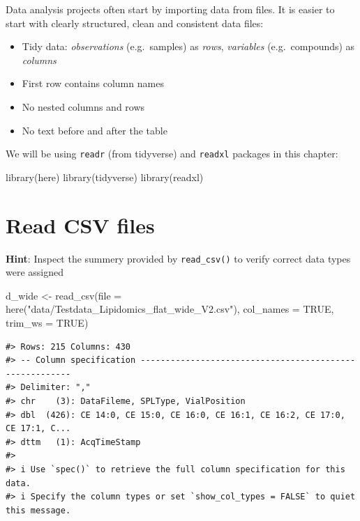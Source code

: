 \documentclass[
  letterpaper,
  DIV=11,
  numbers=noendperiod]{scrreprt}
\newenvironment{Shaded}{\begin{snugshade}}{\end{snugshade}}
\newcommand{\AttributeTok}[1]{\textcolor[rgb]{0.40,0.45,0.13}{#1}}
\newcommand{\ConstantTok}[1]{\textcolor[rgb]{0.56,0.35,0.01}{#1}}
\newcommand{\FunctionTok}[1]{\textcolor[rgb]{0.28,0.35,0.67}{#1}}
\newcommand{\NormalTok}[1]{\textcolor[rgb]{0.00,0.23,0.31}{#1}}
\newcommand{\OtherTok}[1]{\textcolor[rgb]{0.00,0.23,0.31}{#1}}
\newcommand{\StringTok}[1]{\textcolor[rgb]{0.13,0.47,0.30}{#1}}
\providecommand{\tightlist}{%
  \setlength{\itemsep}{0pt}\setlength{\parskip}{0pt}}\usepackage{longtable,booktabs,array}
\begin{document}
Data analysis projects often start by importing data from files. It is
easier to start with clearly structured, clean and consistent data
files:

\begin{itemize}
\tightlist
\item
  Tidy data: \emph{observations} (e.g.~samples) as \emph{rows},
  \emph{variables} (e.g.~compounds) as \emph{columns}
\item
  First row contains column names
\item
  No nested columns and rows
\item
  No text before and after the table
\end{itemize}

We will be using \texttt{readr} (from tidyverse) and \texttt{readxl}
packages in this chapter:

\begin{Shaded}
\begin{Highlighting}[]
\FunctionTok{library}\NormalTok{(here)}
\FunctionTok{library}\NormalTok{(tidyverse)}
\FunctionTok{library}\NormalTok{(readxl)}
\end{Highlighting}
\end{Shaded}

\hypertarget{read-csv-files}{%
\section{Read CSV files}\label{read-csv-files}}

\textbf{Hint}: Inspect the summery provided by \texttt{read\_csv()} to
verify correct data types were assigned

\begin{Shaded}
\begin{Highlighting}[]
\NormalTok{d\_wide }\OtherTok{\textless{}{-}} \FunctionTok{read\_csv}\NormalTok{(}\AttributeTok{file =} \FunctionTok{here}\NormalTok{(}\StringTok{"data/Testdata\_Lipidomics\_flat\_wide\_V2.csv"}\NormalTok{), }
                   \AttributeTok{col\_names =} \ConstantTok{TRUE}\NormalTok{, }
                   \AttributeTok{trim\_ws =} \ConstantTok{TRUE}\NormalTok{)}
\end{Highlighting}
\end{Shaded}

\begin{verbatim}
#> Rows: 215 Columns: 430
#> -- Column specification --------------------------------------------------------
#> Delimiter: ","
#> chr    (3): DataFileme, SPLType, VialPosition
#> dbl  (426): CE 14:0, CE 15:0, CE 16:0, CE 16:1, CE 16:2, CE 17:0, CE 17:1, C...
#> dttm   (1): AcqTimeStamp
#> 
#> i Use `spec()` to retrieve the full column specification for this data.
#> i Specify the column types or set `show_col_types = FALSE` to quiet this message.
\end{verbatim}
\end{document}
